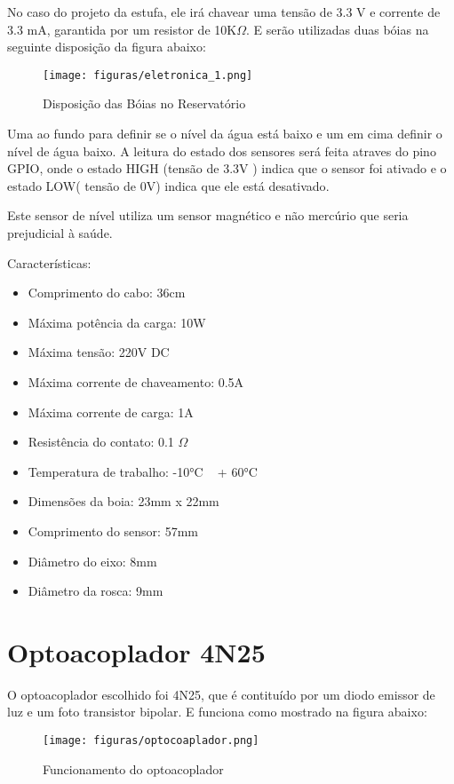 No caso do projeto da estufa, ele irá chavear uma tensão de 3.3 V e corrente de 3.3 mA, garantida por um resistor de 10K$\Omega$. E serão utilizadas duas bóias na seguinte disposição da figura abaixo:\cite{eicos}

\begin{figure}[H]
	\centering
	\texttt{[image: figuras/eletronica\_1.png]}
	\caption{Disposição das Bóias no Reservatório} \label{eletronica_1}
\end{figure}

Uma ao fundo para definir se o nível da água está baixo e um em cima definir o nível de água baixo.  A leitura do estado dos sensores será feita atraves do pino GPIO, onde o estado HIGH (tensão de 3.3V ) indica que o sensor foi ativado e o estado LOW( tensão de 0V) indica que ele está desativado\cite{eicos}.

Este sensor de nível utiliza um sensor magnético e não mercúrio que seria prejudicial à saúde\cite{eicos}.

Características:

\begin{itemize}
	\item Comprimento do cabo: 36cm
	\item Máxima potência da carga: 10W
	\item Máxima tensão: 220V DC
	\item Máxima corrente de chaveamento: 0.5A
	\item Máxima corrente de carga: 1A
	\item Resistência do contato: 0.1 $\Omega$
	\item Temperatura de trabalho: -10°C ~ + 60°C
	\item Dimensões da boia: 23mm x 22mm
	\item Comprimento do sensor: 57mm
	\item Diâmetro do eixo: 8mm
	\item Diâmetro da rosca: 9mm
\end{itemize}

\section{Optoacoplador 4N25}

O optoacoplador escolhido foi 4N25, que é contituído por um diodo emissor de luz e um foto transistor bipolar. E funciona como mostrado na figura abaixo:

\begin{figure}[H]
	\centering
	\texttt{[image: figuras/optocoaplador.png]}
	\caption{Funcionamento do optoacoplador} \label{optocoaplador}
\end{figure}

